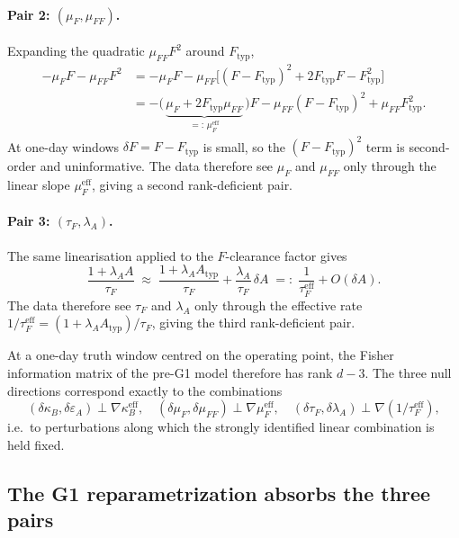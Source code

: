 \paragraph{Pair 2: $(\mu_F,\mu_{FF})$.} Expanding the quadratic
$\mu_{FF} F^2$ around $F_{\mathrm{typ}}$,
\begin{align*}
  -\mu_F F - \mu_{FF} F^2
  &= -\mu_F F - \mu_{FF}\bigl[(F-F_{\mathrm{typ}})^2 + 2 F_{\mathrm{typ}} F - F_{\mathrm{typ}}^2\bigr]\\
  &= -\bigl(\,\underbrace{\mu_F + 2 F_{\mathrm{typ}} \mu_{FF}}_{=:\,\mu_F^{\mathrm{eff}}}\,\bigr) F
     - \mu_{FF}(F-F_{\mathrm{typ}})^2 + \mu_{FF} F_{\mathrm{typ}}^2.
\end{align*}
At one-day windows $\delta F = F - F_{\mathrm{typ}}$ is small, so the
$(F-F_{\mathrm{typ}})^2$ term is second-order and uninformative. The
data therefore see $\mu_F$ and $\mu_{FF}$ only through the linear slope
$\mu_F^{\mathrm{eff}}$, giving a second rank-deficient pair.

\paragraph{Pair 3: $(\tau_F,\lambda_A)$.} The same linearisation
applied to the $F$-clearance factor gives
\begin{equation*}
  \frac{1+\lambda_A A}{\tau_F}
  \;\approx\;
  \frac{1+\lambda_A A_{\mathrm{typ}}}{\tau_F}
  + \frac{\lambda_A}{\tau_F}\,\delta A
  \;=:\;
  \frac{1}{\tau_F^{\mathrm{eff}}} + O(\delta A).
\end{equation*}
The data therefore see $\tau_F$ and $\lambda_A$ only through the
effective rate $1/\tau_F^{\mathrm{eff}} = (1+\lambda_A A_{\mathrm{typ}})/\tau_F$,
giving the third rank-deficient pair.

\smallskip
At a one-day truth window centred on the operating point, the
Fisher information matrix of the pre-G1 model therefore has rank
$d - 3$. The three null directions correspond exactly to the
combinations
\begin{equation}
  (\delta\kappa_B,\delta\varepsilon_A) \perp \nabla \kappa_B^{\mathrm{eff}},
  \quad
  (\delta\mu_F,\delta\mu_{FF}) \perp \nabla \mu_F^{\mathrm{eff}},
  \quad
  (\delta\tau_F,\delta\lambda_A) \perp \nabla(1/\tau_F^{\mathrm{eff}}),
  \label{eq:fim-nulls}
\end{equation}
i.e.\ to perturbations along which the strongly identified linear
combination is held fixed.

\subsection{The G1 reparametrization absorbs the three pairs}

